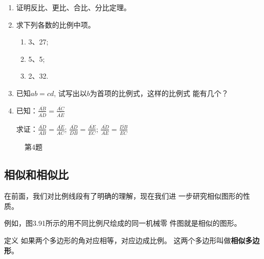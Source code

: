 \begin{ex}
\begin{enumerate}
    \item 证明反比、更比、合比、分比定理。
    \item 求下列各数的比例中项。
\begin{multicols}{3}
    \begin{enumerate}
        \item 3、27;
        \item 5、5;
        \item 2、32.
    \end{enumerate}
\end{multicols}
\item 已知$ab=cd$, 试写出以$b$为首项的比例式，这样的比例式
    能有几个？
    \item 已知：$\frac{\overline{AB}}{\overline{AD}}=\frac{\overline{AC}}{\overline{AE}}$

    求证：$\frac{\overline{AD}}{\overline{AB}}=\frac{\overline{AE}}{\overline{AC}}$; $\frac{\overline{AD}}{\overline{DB}}=\frac{\overline{AE}}{\overline{EC}}$; $\frac{\overline{AD}}{\overline{AE}}=\frac{\overline{DB}}{\overline{EC}}$
\end{enumerate}
\end{ex}

\begin{figure}[htp]
    \centering
{}
    \caption*{第4题}
\end{figure}


\subsection{相似和相似比}
在前面，我们对比例线段有了明确的理解，现在我们进
一步研究相似图形的性质。

例如，图3.91所示的用不同比例尺绘成的同一机械零
件图就是相似的图形。

\begin{blk}
    {定义} 如果两个多边形的角对应相等，对应边成比例。
这两个多边形叫做\textbf{相似多边形}。
\end{blk}




